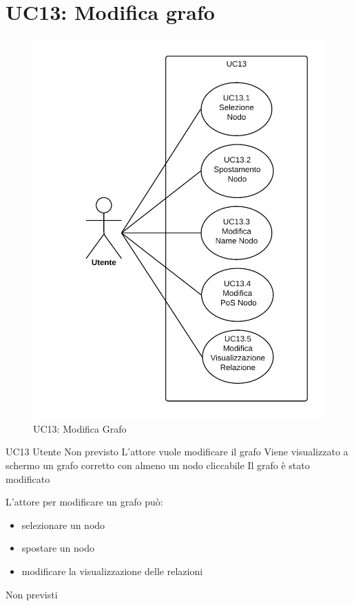 \documentclass[../AnalisideiRequisiti.tex]{subfiles}
\begin{document}
\section{UC13: Modifica grafo}
\begin{figure}[H]
	\centering
	\includegraphics[width=\textwidth]{../img/UC13.png}
	\caption{UC13: Modifica Grafo}
\end{figure}
\UserCase
{UC13}
{Utente}
{Non previsto}
{L'attore vuole modificare il grafo}
{Viene visualizzato a schermo un grafo corretto con almeno un nodo cliccabile }
{Il grafo è stato modificato}
{
	L'attore per modificare un grafo può:
	\begin{itemize}
		\item{} selezionare un nodo 
		\item{} spostare un nodo 	
		\item{} modificare la visualizzazione delle relazioni 		
	\end{itemize}
}
{Non previsti}
\end{document}

